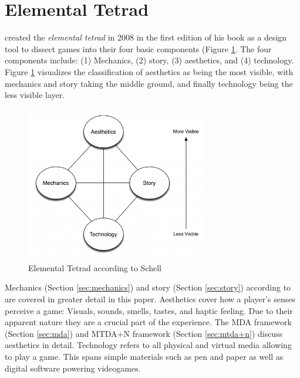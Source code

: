 \section{Elemental Tetrad} \label{sec:elemental-tetrad}
\citeauthor{Schell2014} created the \textit{elemental tetrad} in 2008 in the first edition of his book as a design tool to dissect games into their four basic components (Figure \ref{fig:elemental-tetrad}.
The four components include: (1) Mechanics, (2) story, (3) aesthetics, and (4) technology.
Figure \ref{fig:elemental-tetrad} visualizes the classification of aesthetics as being the most visible, with mechanics and story taking the middle ground, and finally technology being the less visible layer.

\begin{figure}[H]
    \centering
    \includegraphics[width=8cm]{assets/elemental-tetrad.jpg}
    \caption{Elemental Tetrad according to Schell\protect\footnotemark}
    \label{fig:elemental-tetrad}
\end{figure}

Mechanics (Section \ref{sec:mechanics}) and story (Section \ref{sec:story}) according to \citeauthor{Schell2014} are covered in greater detail in this paper.
Aesthetics cover how a player's senses perceive a game: Visuals, sounds, smells, tastes, and haptic feeling.
Due to their apparent nature they are a crucial part of the experience.
The MDA framework (Section \ref{sec:mda}) and MTDA+N framework (Section \ref{sec:mtda+n}) discuss aesthetics in detail.
Technology refers to all physical and virtual media allowing to play a game.
This spans simple materials such as pen and paper as well as digital software powering videogames.



